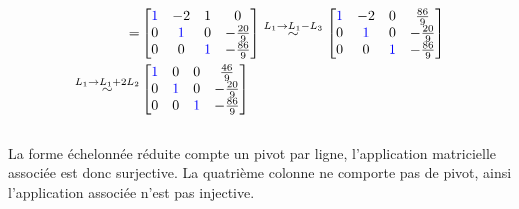 \documentclass{article}
\begin{document}
\begin{align*}
    =
    &\begin{bmatrix}
    \color{blue}1 & -2 & 1 & 0\\
    0 & \color{blue}1 & 0 & -\frac{20}{9}\\
    0 & 0 & \color{blue}1 & -\frac{86}{9}
    \end{bmatrix}
    \overset{L_1 \to L_1 - L_3}{\sim}
    \begin{bmatrix}
    \color{blue}1 & -2 & 0 & \frac{86}{9}\\
    0 & \color{blue}1 & 0 & -\frac{20}{9}\\
    0 & 0 & \color{blue}1 & -\frac{86}{9}
    \end{bmatrix}\\
    \overset{L_1 \to L_1 + 2L_2}{\sim}
    &\begin{bmatrix}
    \color{blue}1 & 0 & 0 & \frac{46}{9}\\
    0 & \color{blue}1 & 0 & -\frac{20}{9}\\
    0 & 0 & \color{blue}1 & -\frac{86}{9}
    \end{bmatrix}
\end{align*}\\
La forme échelonnée réduite compte un pivot par ligne, l'application matricielle associée est donc surjective. La quatrième colonne ne comporte pas de pivot, ainsi l'application associée n'est pas injective.\\
\end{document}
